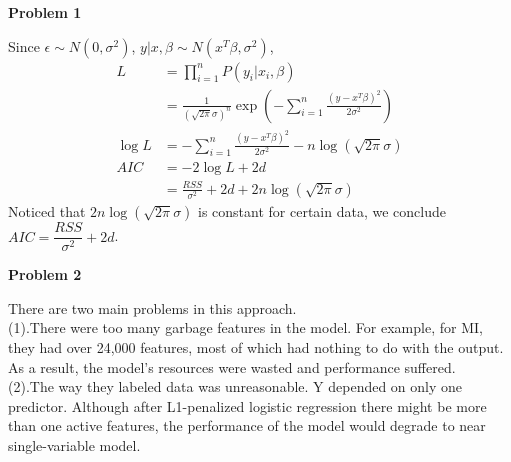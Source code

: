\documentclass[UTF8,12pt]{article}
\newenvironment{problem}[2][Problem]
{ \begin{mdframed}[backgroundcolor=gray!20] \textbf{#1 #2}}
	{  \end{mdframed}}
\newenvironment{answer}
{}
{}
\newenvironment{eq}
{
	\begin{equation}
		\begin{aligned}\nonumber
}
{
		\end{aligned}
	\end{equation}
}
\begin{document}
\renewcommand{\qed}{\quad\qedsymbol}
\begin{problem}{1}
\end{problem}
\begin{answer}
	Since $\epsilon \sim N(0,\sigma^2)$, $y|x,\beta \sim N(x^T\beta,\sigma^2)$,
	\begin{eq}
	L&=\prod_{i=1}^{n} P(y_i|x_i,\beta)\\
	&= \frac{1}{(\sqrt{2\pi}\sigma)^n}\exp{(-\sum_{i=1}^n \frac{(y-x^T\beta)^2}{2\sigma^2})}\\
	\log{L}&=-\sum_{i=1}^n \frac{(y-x^T\beta)^2}{2\sigma^2}-n\log{(\sqrt{2\pi}\sigma)}\\
	AIC &= -2\log{L}+2d\\
	&= \frac{RSS}{\sigma^2} + 2d + 2n\log{(\sqrt{2\pi}\sigma)}
\end{eq}
	Noticed that $2n\log{(\sqrt{2\pi}\sigma)}$ is constant for certain data, we conclude 
	$AIC=\dfrac{RSS}{\sigma^2}+2d$.
\end{answer}

\begin{problem}{2}
\end{problem}
\begin{answer}
	There are two main problems in this approach.\\
	(1).There were too many garbage features in the model. For example,
	for MI, they had over 24,000 features, most of which had nothing to do with the output. 
	As a result, the model's resources were wasted and performance suffered.\\
	(2).The way they labeled data was unreasonable. Y depended on only one predictor.
	Although after L1-penalized logistic regression there might be more than one active features,
	the performance of the model would degrade to near single-variable model.
\end{answer}
\end{document}

